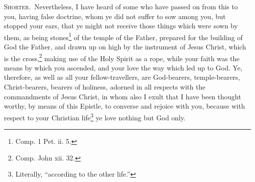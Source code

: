 
\textsc{Shorter.}~Nevertheless, I have heard of some who have passed on from this to you, having false doctrine, whom ye did not suffer to sow among you, but stopped your ears, that ye might not receive those things which were sown by them, as being stones\footnote{Comp. 1 Pet. ii. 5.} of the temple of the Father, prepared for the building of God the Father, and drawn up on high by the instrument of Jesus Christ, which is the cross,\footnote{Comp. John xii. 32.} making use of the Holy Spirit as a rope, while your faith was the means by which you ascended, and your love the way which led up to God. Ye, therefore, as well as all your fellow-travellers, are God-bearers, temple-bearers, Christ-bearers, bearers of holiness, adorned in all respects with the commandments of Jesus Christ, in whom also I exult that I have been thought worthy, by means of this Epistle, to converse and rejoice with you, because with respect to your Christian life\footnote{Literally, “according to the other life.”} ye love nothing but God only.


